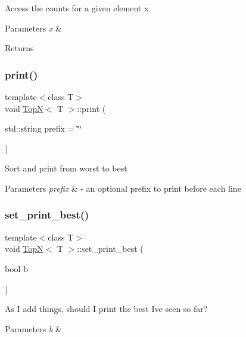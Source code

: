 Access the counts for a given element x 
\begin{DoxyParams}{Parameters}
{\em x} & \\
\hline
\end{DoxyParams}
\begin{DoxyReturn}{Returns}

\end{DoxyReturn}
\mbox{\label{class_top_n_a5064ec2e4e9f1defdc3cb62d9b7ddd00}} 
\subsubsection{\texorpdfstring{print()}{print()}}
{\footnotesize\ttfamily template$<$class T$>$ \\
void \hyperlink{class_top_n}{TopN}$<$ T $>$\+::print (\begin{DoxyParamCaption}\item[{std\+::string}]{prefix = {\ttfamily \char`\"{}\char`\"{}} }\end{DoxyParamCaption})\hspace{0.3cm}{\ttfamily [inline]}}

Sort and print from worst to best 
\begin{DoxyParams}{Parameters}
{\em prefix} & -\/ an optional prefix to print before each line\\
\hline
\end{DoxyParams}
\mbox{\label{class_top_n_a378be54915dab8603b8408ee72310bb7}} 
\subsubsection{\texorpdfstring{set\+\_\+print\+\_\+best()}{set\_print\_best()}}
{\footnotesize\ttfamily template$<$class T$>$ \\
void \hyperlink{class_top_n}{TopN}$<$ T $>$\+::set\+\_\+print\+\_\+best (\begin{DoxyParamCaption}\item[{bool}]{b }\end{DoxyParamCaption})\hspace{0.3cm}{\ttfamily [inline]}}

As I add things, should I print the best I\textquotesingle{}ve seen so far? 
\begin{DoxyParams}{Parameters}
{\em b} & \\
\hline
\end{DoxyParams}
\mbox{\label{class_top_n_a37c7506de12038af705c55fc479dba7b}} 
